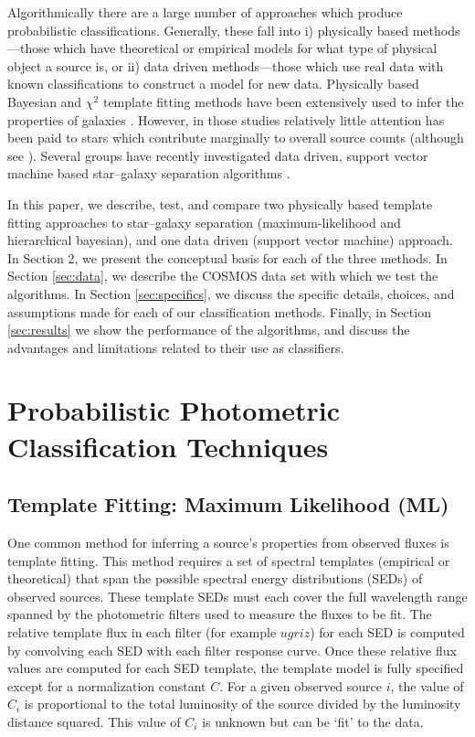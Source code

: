 \documentclass[12pt,preprint]{aastex}
\begin{document}
Algorithmically there are a large number of approaches which produce
probabilistic classifications.  Generally, these fall into i)
physically based methods---those which have theoretical or empirical
models for what type of physical object a source is, or ii) data
driven methods---those which use real data with known classifications
to construct a model for new data.  Physically based Bayesian and
$\chi^2$ template fitting methods have been extensively used to infer
the properties of galaxies \citep[e.g.,][]{coil04a, ilbert09, xia09,
  walcher11a,hildebrandt10}. However, in those studies relatively
little attention has been paid to stars which contribute marginally to
overall source counts (although see \citealt{robin07}).  Several
groups have recently investigated data driven, support vector machine
based star--galaxy separation algorithms
\citep[e.g.,][]{saglia12,solarz12a,tsalmantza12a}.

In this paper, we describe, test, and compare two physically based
template fitting approaches to star--galaxy separation
(maximum-likelihood and hierarchical bayesian), and one data driven
(support vector machine) approach.  In Section 2, we present the
conceptual basis for each of the three methods.  In Section
\ref{sec:data}, we describe the COSMOS data set with which we test the
algorithms.  In Section \ref{sec:specifics}, we discuss the specific
details, choices, and assumptions made for each of our classification
methods. Finally, in Section \ref{sec:results} we show the performance
of the algorithms, and discuss the advantages and limitations related
to their use as classifiers.


%
%
\section{Probabilistic Photometric Classification Techniques}

\subsection{Template Fitting: Maximum Likelihood (ML)}
\label{ssec:MLmethod}

One common method for inferring a source's properties from
observed fluxes is template fitting.  This method requires a set of
spectral templates (empirical or theoretical) that span the possible
spectral energy distributions (SEDs) of observed sources.  These
template SEDs must each cover the full wavelength range spanned by the
photometric filters used to measure the fluxes to be fit.  The
relative template flux in each filter (for example $ugriz$) for each
SED is computed by convolving each SED with each filter response
curve.  Once these relative flux values are computed for
each SED template, the template model is fully specified except for a
normalization constant $C$.  For a given observed source $i$, the
value of $C_i$ is proportional to the total luminosity of the source
divided by the luminosity distance squared.  This value of $C_i$ is
unknown but can be `fit' to the data.
\end{document}
